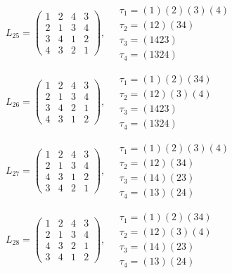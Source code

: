 $L_{25} = \begin{pmatrix} 1 & 2 & 4 & 3 \\ 2 & 1 & 3 & 4 \\ 3 & 4 & 1 & 2 \\ 4 & 3 & 2 & 1 \end{pmatrix}, \quad \begin{matrix} \tau_{1} = (1)(2)(3)(4) \\ \tau_{2} = (1 2)(3 4) \\ \tau_{3} = (1 4 2 3) \\ \tau_{4} = (1 3 2 4) \end{matrix}$

$L_{26} = \begin{pmatrix} 1 & 2 & 4 & 3 \\ 2 & 1 & 3 & 4 \\ 3 & 4 & 2 & 1 \\ 4 & 3 & 1 & 2 \end{pmatrix}, \quad \begin{matrix} \tau_{1} = (1)(2)(3 4) \\ \tau_{2} = (1 2)(3)(4) \\ \tau_{3} = (1 4 2 3) \\ \tau_{4} = (1 3 2 4) \end{matrix}$

$L_{27} = \begin{pmatrix} 1 & 2 & 4 & 3 \\ 2 & 1 & 3 & 4 \\ 4 & 3 & 1 & 2 \\ 3 & 4 & 2 & 1 \end{pmatrix}, \quad \begin{matrix} \tau_{1} = (1)(2)(3)(4) \\ \tau_{2} = (1 2)(3 4) \\ \tau_{3} = (1 4)(2 3) \\ \tau_{4} = (1 3)(2 4) \end{matrix}$

$L_{28} = \begin{pmatrix} 1 & 2 & 4 & 3 \\ 2 & 1 & 3 & 4 \\ 4 & 3 & 2 & 1 \\ 3 & 4 & 1 & 2 \end{pmatrix}, \quad \begin{matrix} \tau_{1} = (1)(2)(3 4) \\ \tau_{2} = (1 2)(3)(4) \\ \tau_{3} = (1 4)(2 3) \\ \tau_{4} = (1 3)(2 4) \end{matrix}$

